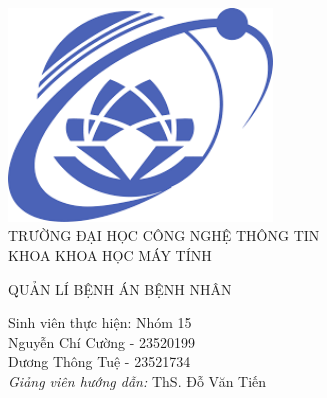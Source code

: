 \documentclass[12pt]{report}
\begin{document}
    
\begin{titlepage}      
    \begin{center}
        \includegraphics[width=7cm]{src/figures/uit.png}\\[2cm]
        {\LARGE TRƯỜNG ĐẠI HỌC CÔNG NGHỆ THÔNG TIN\\[0.5cm]
        KHOA KHOA HỌC MÁY TÍNH}\\

        \vfill

        \linespread{1.2}\huge {
            QUẢN LÍ BỆNH ÁN BỆNH NHÂN 
        }

        \vfill

        {\large
            Sinh viên thực hiện: Nhóm 15
        }\\[0.5cm]

        {\Large 
            Nguyễn Chí Cường - 23520199 \\
            Dương Thông Tuệ - 23521734
        }\\[0.5cm] 
        

        {\large 
            \emph{Giảng viên hướng dẫn:} ThS. Đỗ Văn Tiến}\\[1cm] %
        
                
    \end{center}
\end{titlepage}

\newpage
\tableofcontents


\newpage

\newpage

\end{document}

